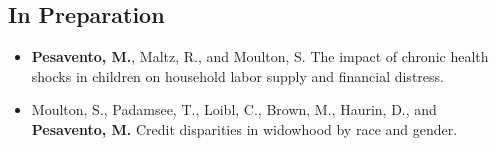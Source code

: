 \subsection{In Preparation}
\begin{itemize}
    \itemsep0.5em
    \item \textbf{Pesavento, M.}, Maltz, R., and Moulton, S. The impact of chronic health shocks in children on household labor supply and financial distress.
    \item Moulton, S., Padamsee, T., Loibl, C., Brown, M., Haurin, D., and \textbf{Pesavento, M.} Credit disparities in widowhood by race and gender.
\end{itemize}